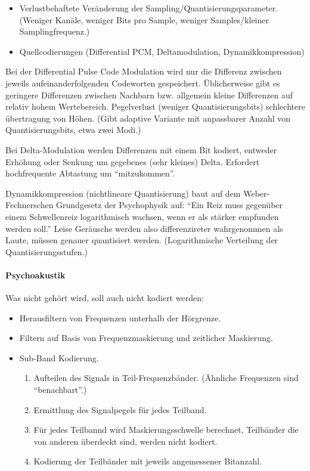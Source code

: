\documentclass[twocolumn]{article}
\begin{document}
\begin{itemize}
    \item Verlustbehaftete Veränderung der Sampling/Quantisierungsparameter. (Weniger Kanäle, weniger Bits pro Sample, weniger Samples/kleiner Samplingfrequenz.)
    
    \item Quellcodierungen (Differential PCM, Deltamodulation, Dynamikkompression)
\end{itemize}

Bei der Differential Pulse Code Modulation wird nur die Differenz zwischen jeweils aufeinanderfolgenden Codeworten gespeichert. Üblicherweise gibt es geringere Differenzen zwischen Nachbarn bzw. allgemein kleine Differenzen auf relativ hohem Wertebereich. Pegelverlust (weniger Quantisierungsbits) schlechtere übertragung von Höhen. (Gibt adaptive Variante mit anpassbarer Anzahl von Quantisierungsbits, etwa zwei Modi.)

Bei Delta-Modulation werden Differenzen mit einem Bit kodiert, entweder Erhöhung oder Senkung um gegebenes (sehr kleines) Delta. Erfordert hochfrequente Abtastung um \enquote{mitzukommen}.  

Dynamikkompression (nichtlineare Quantisierung) baut auf dem Weber-Fechnerschen Grundgesetz der Psychophysik auf: \enquote{Ein Reiz muss gegenüber einem Schwellenreiz logarithmisch wachsen, wenn er als stärker empfunden werden soll.} Leise Geräusche werden also differenzireter wahrgenommen als Laute, müssen genauer quantisiert werden. (Logarithmische Verteilung der Quantisierungsstufen.)

\paragraph{Psychoakustik}

Was nicht gehört wird, soll auch nicht kodiert werden:
\begin{itemize}
    \item Herausfiltern von Frequenzen unterhalb der Hörgrenze.
    \item Filtern auf Basis von Frequenzmaskierung und zeitlicher Maskierung.
    \item Sub-Band Kodierung.
    \begin{enumerate}
        \item Aufteilen des Signals in Teil-Frequenzbänder. (Ähnliche Frequenzen sind \enquote{benachbart}.)
        \item Ermittlung des Signalpegels für jedes Teilband.
        \item Für jedes Teilbannd wird Maskierungsschwelle berechnet, Teilbänder die von anderen überdeckt sind, werden nicht kodiert.
        \item Kodierung der Teilbänder mit jeweils angemessener Bitanzahl.
    \end{enumerate}
\end{itemize}
\end{document}
